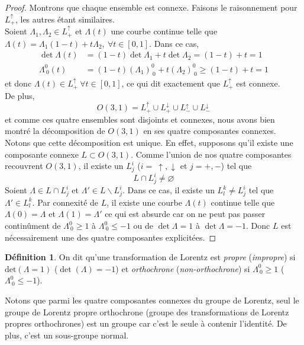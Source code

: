 \documentclass[a4paper,11pt]{report}
\theoremstyle{definition}
\theoremstyle{plain}
\theoremstyle{definition}
\newtheorem{defn}{Définition}[chapter]
\theoremstyle{remark}
\begin{document}
\begin{proof}
                Montrons que chaque ensemble est connexe. Faisons le raisonnement pour $L_+^\uparrow$, les autres étant similaires.\\
                Soient $\Lambda_1, \Lambda_2 \in L_+^\uparrow$ et $\Lambda(t)$ une courbe continue telle que $\Lambda(t) = \Lambda_1 (1 - t) + t\Lambda_2, ~\forall t \in [0,1]$. Dans ce cas, 
                \begin{align}
                    \det \Lambda(t) &= (1 - t)\det \Lambda_1 + t \det \Lambda_2 = (1 - t) + t = 1\\
                    \Lambda^0_{~0}(t) &= (1 - t)(\Lambda_1)^{0}_{~0} + t(\Lambda_2)^{0}_{~0} \ge (1 - t) + t = 1
                \end{align}
                et donc $\Lambda(t) \in L_+^\uparrow~\forall t \in [0,1]$, ce qui dit exactement que $L_+^\uparrow$ est connexe. \\
                De plus,  
                \begin{equation}
                    O(3, 1) = L_+^\uparrow \cup L_+^\downarrow \cup L_-^\uparrow \cup L_-^\downarrow 
                \end{equation}
                et comme ces quatre ensembles sont disjoints et connexes, nous avons bien montré la décomposition de $O(3, 1)$ en ses quatre composantes connexes.\\
                Notons que cette décomposition est unique. En effet, supposons qu'il existe une composante connexe $L \subset O(3, 1)$. Comme l'union de nos quatre composantes recouvrent $O(3, 1)$, il existe un $L^i_j$ ($i = ~\uparrow, \downarrow$ et $j = +, -$) tel que 
                \begin{equation}
                    L \cap L^i_j \neq \varnothing
                \end{equation}
                Soient $\Lambda \in L \cap L^i_j $ et $\Lambda' \in L\backslash L^i_j$. Dans ce cas, il existe un $L^k_l \neq L^i_j$ tel que $\Lambda' \in L^k_l$. Par connexité de $L$, il existe une courbe $\Lambda(t)$ continue telle que $\Lambda(0) = \Lambda$ et $\Lambda(1) = \Lambda'$ ce qui est absurde car on ne peut pas passer continûment de $\Lambda^0_{~0} \geq 1$ à $\Lambda^0_{~0} \leq -1$ ou de $\det \Lambda = 1$ à $\det \Lambda = -1$. Donc $L$ est nécessairement une des quatre composantes explicitées.
            \end{proof}
            \begin{defn}
                On dit qu'une transformation de Lorentz est \textit{propre} (\textit{impropre}) si $\text{det}(\Lambda = 1)$ ($\det(\Lambda) = -1$) et \textit{orthochrone} (\textit{non-orthochrone}) si $\Lambda^0_{~0}\geq1$ ($\Lambda^0_{~0}\leq-1$). 
            \end{defn}
            Notons que parmi les quatre composantes connexes du groupe de Lorentz, seul le groupe de Lorentz propre orthochrone (groupe des transformations de Lorentz propres orthochrones) est un groupe car c'est le seule à contenir l'identité. De plus, c'est un sous-groupe normal.
            
\end{document}
